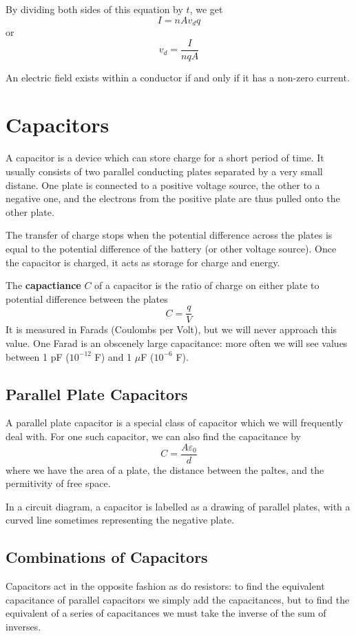 \documentclass[12pt]{article}
\begin{document}
By dividing both sides of this equation by $t$, we get \[ I = n A v_d q \] or \[ v_d = \frac{I}{n q A} \]

An electric field exists within a conductor if and only if it has a non-zero current.

\section*{Capacitors}
A capacitor is a device which can store charge for a short period of time. It usually consists of two parallel conducting plates separated by a very small distane. One plate is connected to a positive voltage source, the other to a negative one, and the electrons from the positive plate are thus pulled onto the other plate.

The transfer of charge stops when the potential difference across the plates is equal to the potential difference of the battery (or other voltage source). Once the capacitor is charged, it acts as storage for charge and energy.

The {\bf capactiance} $C$ of a capacitor is the ratio of charge on either plate to potential difference between the plates \[ C = \frac{q}{V} \] It is measured in Farads (Coulombs per Volt), but we will never approach this value. One Farad is an obscenely large capacitance: more often we will see values between 1 pF ($10^{-12}$ F) and 1 $\mu$F ($10^{-6}$ F).

\subsection*{Parallel Plate Capacitors}
A parallel plate capacitor is a special class of capacitor which we will frequently deal with. For one such capacitor, we can also find the capacitance by \[ C = \frac{A \varepsilon_0}{d} \] where we have the area of a plate, the distance between the paltes, and the permitivity of free space.

In a circuit diagram, a capacitor is labelled as a drawing of parallel plates, with a curved line sometimes representing the negative plate.

\subsection*{Combinations of Capacitors}
Capacitors act in the opposite fashion as do resistors: to find the equivalent capacitance of parallel capacitors we simply add the capacitances, but to find the equivalent of a series of capacitances we must take the inverse of the sum of inverses.
\end{document}
